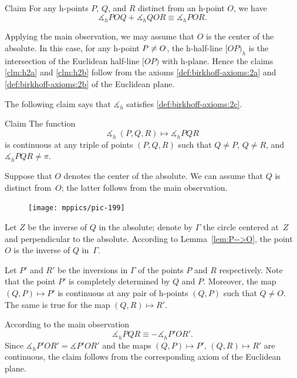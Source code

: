 \begin{thm}{Claim}\label{clm:h2b}
For any h-points $P$, $Q$, and $R$ distinct from an h-point $O$, we have
$$\measuredangle_h P O Q+\measuredangle_h Q O R
\equiv\measuredangle_h P O R.$$

\end{thm}

Applying the main observation, 
we may assume that $O$ is the center of the absolute.
In this case, for any h-point $P\z\ne O$, the h-half-line
$[OP)_h$ is the intersection of the Euclidean half-line $[OP)$ with h-plane.
Hence the claims \ref{clm:h2a} and \ref{clm:h2b} 
follow from the axioms \ref{def:birkhoff-axioms:2a} and \ref{def:birkhoff-axioms:2b} of the Euclidean plane.
\qeds

The following claim says that
$\measuredangle_h$ satisfies
 \ref{def:birkhoff-axioms:2c}.

\begin{thm}{Claim}\label{clm:h2c}
The function 
$$\measuredangle_h\:(P,Q,R)\mapsto\measuredangle_h P Q R$$
is continuous at any triple of points $(P,Q,R)$
such that $Q\ne P$, $Q\ne R$, and $\measuredangle_h P Q R\ne\pi$.
\end{thm}

Suppose that $O$ denotes the center of the absolute.
We can assume that $Q$ is distinct from~$O$;
the latter follows from the main observation.

\begin{figure}
\vskip-4mm
\centering
\texttt{[image: mppics/pic-199]}
\end{figure}

Let $Z$ be the inverse of $Q$ in the absolute;
denote by $\Gamma$ the circle centered at~$Z$ and perpendicular to the absolute.
According to Lemma~\ref{lem:P-->O},
the point $O$ is the inverse of $Q$ in~$\Gamma$.

Let $P'$ and $R'$ be the inversions in $\Gamma$ of the points $P$ and $R$ respectively.
Note that the point $P'$ is completely determined by $Q$ and $P$.
Moreover, the map $(Q,P)\mapsto P'$ is continuous at any pair of h-points $(Q,P)$ such that $Q\ne O$.
The same is true for the map $(Q,R)\mapsto R'$.

According to the main observation 
$$\measuredangle_h P Q R\equiv -\measuredangle_h P' O R'.$$
Since $\measuredangle_h P' O R'=\measuredangle P' O R'$ and 
the maps $(Q,P)\mapsto P'$, $(Q,R)\mapsto R'$ are continuous,
the claim follows from the corresponding axiom of the Euclidean plane.
\qeds

